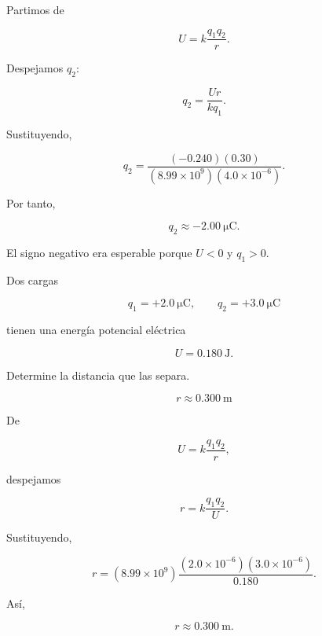 \begin{explicacion}

Partimos de

\[
U=k\frac{q_1q_2}{r}.
\]

Despejamos \(q_2\):

\[
q_2=\frac{Ur}{kq_1}.
\]

Sustituyendo,

\[
q_2
=
\frac{(-0.240)(0.30)}
{(8.99\times10^9)(4.0\times10^{-6})}.
\]

Por tanto,

\[
\boxed{q_2\approx-\SI{2.00}{\micro\coulomb}}.
\]

El signo negativo era esperable porque \(U<0\) y \(q_1>0\).

\end{explicacion}


\begin{ejercicio}

Dos cargas

\[
q_1=+\SI{2.0}{\micro\coulomb},
\qquad
q_2=+\SI{3.0}{\micro\coulomb}
\]

tienen una energía potencial eléctrica

\[
U=\SI{0.180}{\joule}.
\]

Determine la distancia que las separa.

\end{ejercicio}

\begin{respuesta}

\[
\boxed{r\approx\SI{0.300}{\metre}}
\]

\end{respuesta}

\begin{explicacion}

De

\[
U=k\frac{q_1q_2}{r},
\]

despejamos

\[
r=k\frac{q_1q_2}{U}.
\]

Sustituyendo,

\[
r
=
(8.99\times10^9)
\frac{(2.0\times10^{-6})(3.0\times10^{-6})}{0.180}.
\]

Así,

\[
\boxed{r\approx\SI{0.300}{\metre}}.
\]

\end{explicacion}


